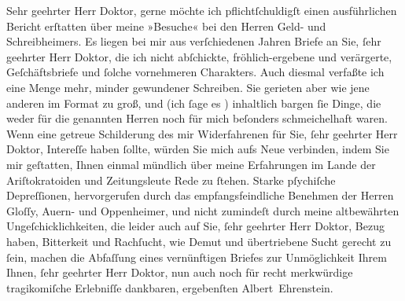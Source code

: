 \pstart{}Sehr geehrter Herr Doktor,\pend\vspace{0.5em}
\pstart
           gerne möchte ich pflichtſchuldigſt einen ausführlichen Bericht erſtatten über meine
               »Besuche« bei den Herren Geld- und Schreibheimers. Es liegen bei mir aus verſchiedenen Jahren Briefe
               an Sie, ſehr geehrter Herr Doktor, die ich nicht abſchickte, fröhlich-ergebene und
               verärgerte, Geſchäftsbriefe und ſolche vornehmeren Charakters. Auch diesmal verfaßte
               ich eine Menge mehr, minder gewundener Schreiben. Sie gerieten aber wie jene anderen
               im Format zu groß, und (ich ſage es \label{K_L01835-1v}\label{K_L01835-1}) {\pb}inhaltlich bargen ſie Dinge, die weder für die genannten Herren noch für mich
               beſonders schmeichelhaft waren. Wenn eine getreue Schilderung des mir Widerfahrenen
               für Sie, ſehr geehrter Herr Doktor, Intereſſe haben ſollte, würden Sie mich aufs Neue
               verbinden, indem Sie mir geſtatten, Ihnen einmal mündlich über meine Erfahrungen im
               Lande der Ariſtokratoiden und Zeitungsleute Rede zu ſtehen. Starke pſychiſche
               Depreſſionen, hervorgerufen durch das empfangsfeindliche Benehmen der Herren Gloſſy, Auern- und Oppenheimer, und {\pb}nicht zumindeſt durch meine altbewährten
               Ungeſchicklichkeiten, die leider auch auf Sie, ſehr geehrter Herr Doktor, Bezug
               haben, Bitterkeit und Rachſucht, wie Demut und übertriebene Sucht gerecht zu ſein,
               machen die Abfaſſung eines vernünftigen Briefes zur Unmöglichkeit Ihrem Ihnen, ſehr
               geehrter Herr Doktor, nun auch noch für recht merkwürdige tragikomiſche Erlebniſſe
               dankbaren, ergebenſten\pend
           \pstart \spacefill\mbox{Albert Ehrenstein.}\pend{}\endnumbering{}  
      